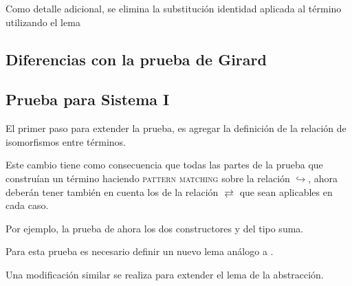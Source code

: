 \documentclass[]{report}
\begin{document}
	Como detalle adicional, se elimina la substitución identidad aplicada al término utilizando el lema
	\AgdaSpace{}%
	\AgdaSymbol{:}\AgdaSpace{}%
	\AgdaSpace{}%
	\AgdaSymbol{\}}\AgdaSpace{}%
	\AgdaSymbol{\{}\AgdaSpace{}%
	\AgdaSymbol{:}\AgdaSpace{}%
	\AgdaSpace{}%
	\AgdaSpace{}%
	\AgdaSymbol{\}}\AgdaSpace{}%
	\AgdaSpace{}%
	\AgdaSpace{}%
	\AgdaSpace{}%
	\AgdaSpace{}%
	\AgdaSpace{}%
	\AgdaSpace{}%
	

	\subsection{Diferencias con la prueba de Girard}

	\subsection{Prueba para Sistema I}
	
	El primer paso para extender la prueba, es agregar la definición de  la relación de isomorfismos entre términos.
	
	
	Este cambio tiene como consecuencia que todas las partes de la prueba que construían un término \snstar haciendo \textsc{pattern matching} sobre la relación $\hookrightarrow$, ahora deberán tener también en cuenta los de la relación $\rightleftarrows$ que sean aplicables en cada caso.
	
	Por ejemplo, la prueba de  ahora los dos constructores  y  del tipo suma.
	
	
	Para esta prueba es necesario definir un nuevo lema análogo a .
	
	
	Una modificación similar se realiza para extender el lema de la abstracción.
	
\end{document}
